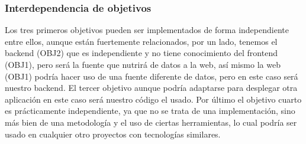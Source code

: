 \subsubsection{Interdependencia de objetivos}
Los tres primeros objetivos pueden ser implementados de forma independiente entre ellos, aunque están fuertemente relacionados, por un lado, tenemos el backend (OBJ2) que es independiente y no tiene conocimiento del frontend (OBJ1), pero será la fuente que nutrirá de datos a la web, así mismo la web (OBJ1) podría hacer uso de una fuente diferente de datos, pero en este caso será nuestro backend. El tercer objetivo aunque podría adaptarse para desplegar otra aplicación en este caso será nuestro código el usado. Por último el objetivo cuarto es prácticamente independiente, ya que no se trata de una implementación, sino más bien de una metodología y el uso de ciertas herramientas, lo cual podría ser usado en cualquier otro proyectos con tecnologías similares.



